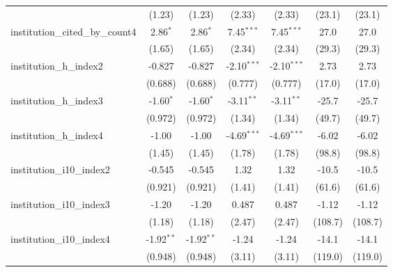 \begin{tabular}{lcccccc}
                                         & (1.23)        & (1.23)        & (2.33)        & (2.33)        & (23.1)        & (23.1)\\   
   institution\_cited\_by\_count4        & 2.86$^{*}$    & 2.86$^{*}$    & 7.45$^{***}$  & 7.45$^{***}$  & 27.0          & 27.0\\   
                                         & (1.65)        & (1.65)        & (2.34)        & (2.34)        & (29.3)        & (29.3)\\   
   institution\_h\_index2                & -0.827        & -0.827        & -2.10$^{***}$ & -2.10$^{***}$ & 2.73          & 2.73\\   
                                         & (0.688)       & (0.688)       & (0.777)       & (0.777)       & (17.0)        & (17.0)\\   
   institution\_h\_index3                & -1.60$^{*}$   & -1.60$^{*}$   & -3.11$^{**}$  & -3.11$^{**}$  & -25.7         & -25.7\\   
                                         & (0.972)       & (0.972)       & (1.34)        & (1.34)        & (49.7)        & (49.7)\\   
   institution\_h\_index4                & -1.00         & -1.00         & -4.69$^{***}$ & -4.69$^{***}$ & -6.02         & -6.02\\   
                                         & (1.45)        & (1.45)        & (1.78)        & (1.78)        & (98.8)        & (98.8)\\   
   institution\_i10\_index2              & -0.545        & -0.545        & 1.32          & 1.32          & -10.5         & -10.5\\   
                                         & (0.921)       & (0.921)       & (1.41)        & (1.41)        & (61.6)        & (61.6)\\   
   institution\_i10\_index3              & -1.20         & -1.20         & 0.487         & 0.487         & -1.12         & -1.12\\   
                                         & (1.18)        & (1.18)        & (2.47)        & (2.47)        & (108.7)       & (108.7)\\   
   institution\_i10\_index4              & -1.92$^{**}$  & -1.92$^{**}$  & -1.24         & -1.24         & -14.1         & -14.1\\   
                                         & (0.948)       & (0.948)       & (3.11)        & (3.11)        & (119.0)       & (119.0)\\   

\end{tabular}
